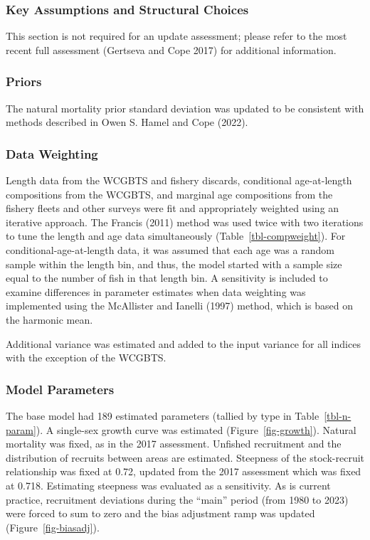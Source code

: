 \documentclass[
]{scrartcl}
\begin{document}
\subsubsection{Key Assumptions and Structural
Choices}\label{key-assumptions-and-structural-choices}

This section is not required for an update assessment; please refer to
the most recent full assessment (Gertseva and Cope 2017) for additional
information.

\subsubsection{Priors}\label{priors}

The natural mortality prior standard deviation was updated to be
consistent with methods described in Owen S. Hamel and Cope (2022).

\subsubsection{Data Weighting}\label{data-weighting}

Length data from the WCGBTS and fishery discards, conditional
age-at-length compositions from the WCGBTS, and marginal age
compositions from the fishery fleets and other surveys were fit and
appropriately weighted using an iterative approach. The Francis (2011)
method was used twice with two iterations to tune the length and age
data simultaneously (Table~\ref{tbl-compweight}). For
conditional-age-at-length data, it was assumed that each age was a
random sample within the length bin, and thus, the model started with a
sample size equal to the number of fish in that length bin. A
sensitivity is included to examine differences in parameter estimates
when data weighting was implemented using the McAllister and Ianelli
(1997) method, which is based on the harmonic mean.

Additional variance was estimated and added to the input variance for
all indices with the exception of the WCGBTS.

\subsubsection{Model Parameters}\label{model-parameters}

The base model had 189 estimated parameters (tallied by type in
Table~\ref{tbl-n-param}). A single-sex growth curve was estimated
(Figure~\ref{fig-growth}). Natural mortality was fixed, as in the 2017
assessment. Unfished recruitment and the distribution of recruits
between areas are estimated. Steepness of the stock-recruit relationship
was fixed at 0.72, updated from the 2017 assessment which was fixed at
0.718. Estimating steepness was evaluated as a sensitivity. As is
current practice, recruitment deviations during the ``main'' period
(from 1980 to 2023) were forced to sum to zero and the bias adjustment
ramp was updated (Figure~\ref{fig-biasadj}).
\end{document}
